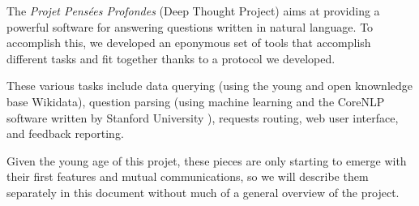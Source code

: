 The {\em Projet Pensées Profondes} (Deep Thought Project) aims at
providing a powerful software for answering questions written in
natural language.
To accomplish this, we developed an eponymous set of tools that
accomplish different tasks and fit together thanks to a protocol
we developed.

These various tasks include data querying (using the young and open
knownledge base Wikidata), question parsing (using machine learning and the
CoreNLP software written by Stanford University ),
requests routing, web user interface, and feedback reporting.

Given the young age of this projet, these pieces are only starting
to emerge with their first features and mutual communications,
so we will describe them separately in this document without
much of a general overview of the project.
